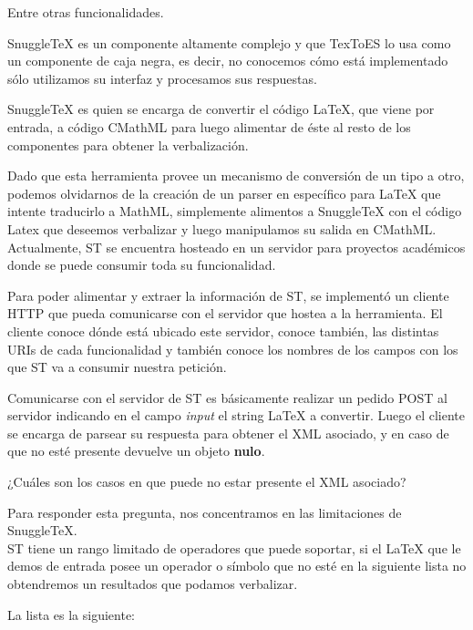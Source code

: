 Entre otras funcionalidades.

SnuggleTeX es un componente altamente complejo y que TexToES lo usa como un componente de caja negra, es decir, no conocemos cómo está implementado sólo utilizamos su interfaz y procesamos sus respuestas.

SnuggleTeX es quien se encarga de convertir el código LaTeX\cite{4}, que viene por entrada, a código CMathML para luego alimentar de éste al resto de los componentes para obtener la verbalización.

Dado que esta herramienta provee un mecanismo de conversión de un tipo a otro, podemos olvidarnos de la creación de un parser en específico para LaTeX que intente traducirlo a MathML, simplemente alimentos a SnuggleTeX con el código Latex que deseemos verbalizar y luego manipulamos su salida en CMathML. Actualmente, ST se encuentra hosteado en un servidor para proyectos académicos donde se puede consumir toda su funcionalidad.

Para poder alimentar y extraer la información de ST, se implementó un cliente HTTP que pueda comunicarse con el servidor que hostea a la herramienta. El cliente conoce dónde está ubicado este servidor, conoce también, las distintas URIs de cada funcionalidad y también conoce los nombres de los campos con los que ST va a consumir nuestra petición.

Comunicarse con el servidor de ST es básicamente realizar un pedido POST al servidor indicando en el campo \textit{input} el string LaTeX a convertir. Luego el cliente se encarga de parsear su respuesta para obtener el XML asociado, y en caso de que no esté presente devuelve un objeto \textbf{nulo}.

¿Cuáles son los casos en que puede no estar presente el XML asociado?

Para responder esta pregunta, nos concentramos en las limitaciones de SnuggleTeX. \\
ST tiene un rango limitado de operadores que puede soportar, si el LaTeX que le demos de entrada posee un operador o símbolo que no esté en la siguiente lista no obtendremos un resultados que podamos verbalizar.

La lista es la siguiente:

